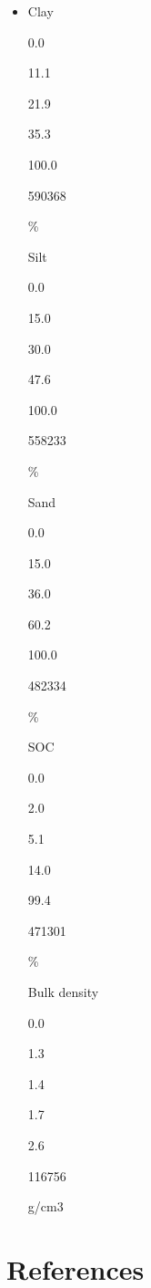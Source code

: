 \documentclass[
  10pt,
  b5paper,
  oneside]{book}
\begin{document}
\begin{itemize}
\item
  Clay

  0.0

  11.1

  21.9

  35.3

  100.0

  590368

  \%

  Silt

  0.0

  15.0

  30.0

  47.6

  100.0

  558233

  \%

  Sand

  0.0

  15.0

  36.0

  60.2

  100.0

  482334

  \%

  SOC

  0.0

  2.0

  5.1

  14.0

  99.4

  471301

  \%

  Bulk density

  0.0

  1.3

  1.4

  1.7

  2.6

  116756

  g/cm3
\end{itemize}

\hypertarget{references}{%
\chapter*{References}\label{references}}


\end{document}
